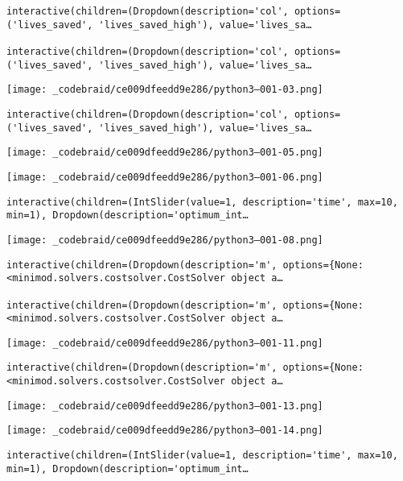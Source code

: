 \documentclass[
]{article}
\begin{document}
\begin{verbatim}
interactive(children=(Dropdown(description='col', options=('lives_saved', 'lives_saved_high'), value='lives_sa…

interactive(children=(Dropdown(description='col', options=('lives_saved', 'lives_saved_high'), value='lives_sa…
\end{verbatim}

\texttt{[image: \_codebraid/ce009dfeedd9e286/python3--001-03.png]}

\begin{verbatim}
interactive(children=(Dropdown(description='col', options=('lives_saved', 'lives_saved_high'), value='lives_sa…
\end{verbatim}

\texttt{[image: \_codebraid/ce009dfeedd9e286/python3--001-05.png]}

\texttt{[image: \_codebraid/ce009dfeedd9e286/python3--001-06.png]}

\begin{verbatim}
interactive(children=(IntSlider(value=1, description='time', max=10, min=1), Dropdown(description='optimum_int…
\end{verbatim}

\texttt{[image: \_codebraid/ce009dfeedd9e286/python3--001-08.png]}

\begin{verbatim}
interactive(children=(Dropdown(description='m', options={None: <minimod.solvers.costsolver.CostSolver object a…

interactive(children=(Dropdown(description='m', options={None: <minimod.solvers.costsolver.CostSolver object a…
\end{verbatim}

\texttt{[image: \_codebraid/ce009dfeedd9e286/python3--001-11.png]}

\begin{verbatim}
interactive(children=(Dropdown(description='m', options={None: <minimod.solvers.costsolver.CostSolver object a…
\end{verbatim}

\texttt{[image: \_codebraid/ce009dfeedd9e286/python3--001-13.png]}

\texttt{[image: \_codebraid/ce009dfeedd9e286/python3--001-14.png]}

\begin{verbatim}
interactive(children=(IntSlider(value=1, description='time', max=10, min=1), Dropdown(description='optimum_int…
\end{verbatim}
\end{document}
